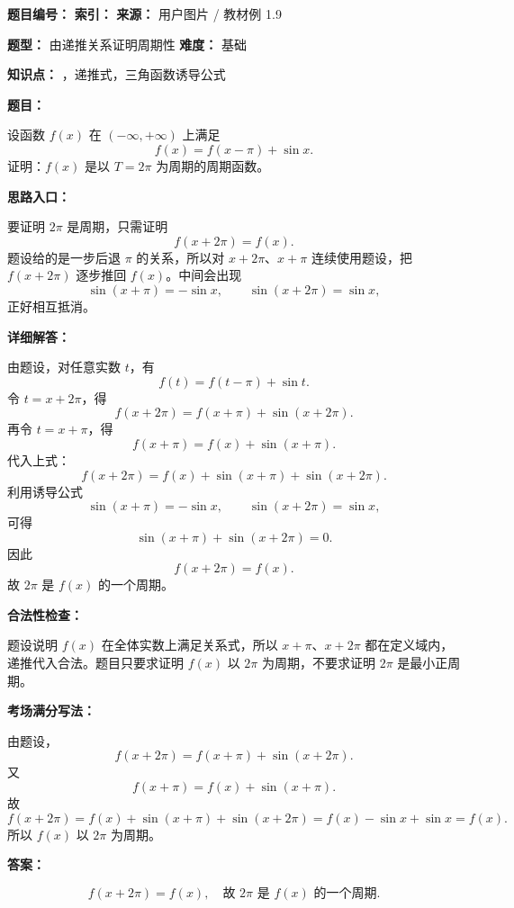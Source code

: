 \begin{problemBox}
\begin{problemMeta}
\textbf{题目编号：}  \quad
\textbf{索引：}  \quad
\textbf{来源：} 用户图片 / 教材例 1.9

\textbf{题型：} 由递推关系证明周期性 \quad
\textbf{难度：} 基础

\textbf{知识点：} ，递推式，三角函数诱导公式
\end{problemMeta}

\textbf{题目：}

设函数 \(f(x)\) 在 \((-\infty,+\infty)\) 上满足
\[
f(x)=f(x-\pi)+\sin x.
\]
证明：\(f(x)\) 是以 \(T=2\pi\) 为周期的周期函数。
\end{problemBox}

\begin{solutionBox}
\textbf{思路入口：}

要证明 \(2\pi\) 是周期，只需证明
\[
f(x+2\pi)=f(x).
\]
题设给的是一步后退 \(\pi\) 的关系，所以对 \(x+2\pi\)、\(x+\pi\) 连续使用题设，把 \(f(x+2\pi)\) 逐步推回 \(f(x)\)。中间会出现
\[
\sin(x+\pi)=-\sin x,\qquad \sin(x+2\pi)=\sin x,
\]
正好相互抵消。

\textbf{详细解答：}

由题设，对任意实数 \(t\)，有
\[
f(t)=f(t-\pi)+\sin t.
\]
令 \(t=x+2\pi\)，得
\[
f(x+2\pi)=f(x+\pi)+\sin(x+2\pi).
\]
再令 \(t=x+\pi\)，得
\[
f(x+\pi)=f(x)+\sin(x+\pi).
\]
代入上式：
\[
f(x+2\pi)=f(x)+\sin(x+\pi)+\sin(x+2\pi).
\]
利用诱导公式
\[
\sin(x+\pi)=-\sin x,\qquad \sin(x+2\pi)=\sin x,
\]
可得
\[
\sin(x+\pi)+\sin(x+2\pi)=0.
\]
因此
\[
f(x+2\pi)=f(x).
\]
故 \(2\pi\) 是 \(f(x)\) 的一个周期。

\textbf{合法性检查：}

题设说明 \(f(x)\) 在全体实数上满足关系式，所以 \(x+\pi\)、\(x+2\pi\) 都在定义域内，递推代入合法。题目只要求证明 \(f(x)\) 以 \(2\pi\) 为周期，不要求证明 \(2\pi\) 是最小正周期。

\textbf{考场满分写法：}

由题设，
\[
f(x+2\pi)=f(x+\pi)+\sin(x+2\pi).
\]
又
\[
f(x+\pi)=f(x)+\sin(x+\pi).
\]
故
\[
f(x+2\pi)=f(x)+\sin(x+\pi)+\sin(x+2\pi)
=f(x)-\sin x+\sin x=f(x).
\]
所以 \(f(x)\) 以 \(2\pi\) 为周期。

\textbf{答案：}

\[
\boxed{f(x+2\pi)=f(x),\quad \text{故 } 2\pi\text{ 是 }f(x)\text{ 的一个周期}.}
\]
\end{solutionBox}

